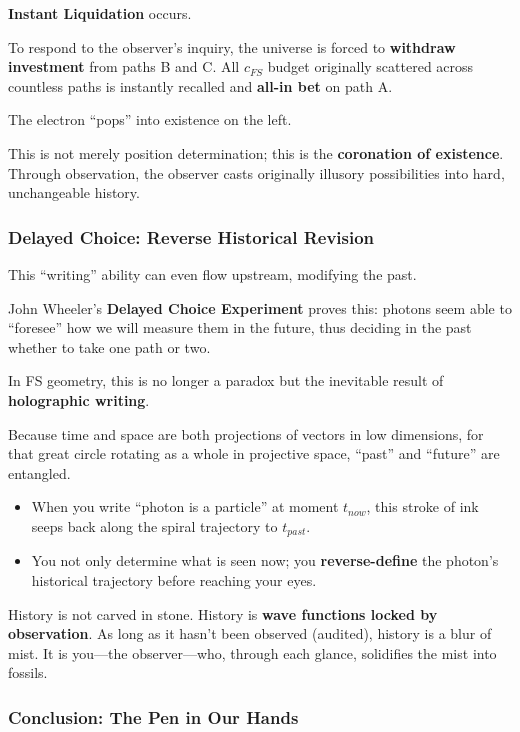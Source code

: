 \textbf{Instant Liquidation} occurs.

To respond to the observer's inquiry, the universe is forced to \textbf{withdraw investment} from paths B and C. All $c_{FS}$ budget originally scattered across countless paths is instantly recalled and \textbf{all-in bet} on path A.

The electron ``pops'' into existence on the left.

This is not merely position determination; this is the \textbf{coronation of existence}. Through observation, the observer casts originally illusory possibilities into hard, unchangeable history.

\subsubsection{Delayed Choice: Reverse Historical Revision}

This ``writing'' ability can even flow upstream, modifying the past.

John Wheeler's \textbf{Delayed Choice Experiment} proves this: photons seem able to ``foresee'' how we will measure them in the future, thus deciding in the past whether to take one path or two.

In FS geometry, this is no longer a paradox but the inevitable result of \textbf{holographic writing}.

Because time and space are both projections of vectors in low dimensions, for that great circle rotating as a whole in projective space, ``past'' and ``future'' are entangled.

\begin{itemize}
\item When you write ``photon is a particle'' at moment $t_{now}$, this stroke of ink seeps back along the spiral trajectory to $t_{past}$.

\item You not only determine what is seen now; you \textbf{reverse-define} the photon's historical trajectory before reaching your eyes.
\end{itemize}

History is not carved in stone. History is \textbf{wave functions locked by observation}. As long as it hasn't been observed (audited), history is a blur of mist. It is you---the observer---who, through each glance, solidifies the mist into fossils.

\subsubsection{Conclusion: The Pen in Our Hands}

